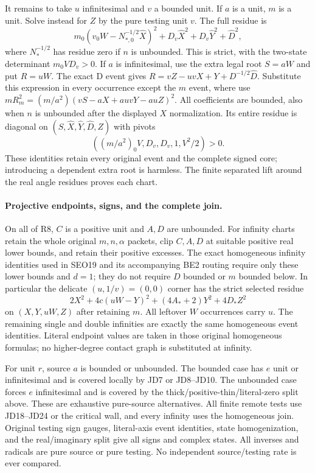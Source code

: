 It remains to take $u$ infinitesimal and $v$ a bounded unit.  If
$a$ is a unit, $m$ is a unit.  Solve instead for $Z$ by the pure
testing unit $v$.  The full residue is
\[
 m_0(v_0W-N_{*,0}^{-1/2}\widehat X)^2
       +D_v\widehat X^2+D_v\widehat Y^2+\widehat D^2,
                                                               \tag{JD23}
\]
where $N_*^{-1/2}$ has residue zero if $n$ is unbounded.  This is
strict, with the two-state determinant $m_0V D_v>0$.
If $a$ is infinitesimal, use the extra legal root $S=aW$ and put
$R=uW$.  The exact D event gives
$R=vZ-uvX+Y+D^{-1/2}\widehat D$.  Substitute this expression
in every occurrence except the $m$ event, where use
$mR_m^2=(m/a^2)(vS-aX+auvY-auZ)^2$.
All coefficients are bounded, also when $n$ is unbounded after
the displayed $X$ normalization.  Its entire residue is diagonal
on $(S,\widehat X,\widehat Y,\widehat D,Z)$ with pivots
\[
                    ((m/a^2)_0V,D_v,D_v,1,V^2/2)>0.   \tag{JD24}
\]
These identities retain every original event and the complete signed
core; introducing a dependent extra root is harmless.  The finite
separated lift around the real angle residues proves each chart.

\paragraph{Projective endpoints, signs, and the complete join.}
On all of R8, $C$ is a positive unit and $A,D$ are unbounded.
For infinity charts retain the whole original $m,n,\alpha$ packets,
clip $C,A,D$ at suitable positive real lower bounds, and retain their
positive excesses.  The exact homogeneous infinity identities used
in SEO19 and its accompanying BE2 routing require only these lower
bounds and $d=1$; they do not require $D$ bounded or $m$ bounded
below.  In particular the delicate $(u,1/v)=(0,0)$ corner has the
strict selected residue
\[
 2X^2+4c(uW-Y)^2+(4A_*+2)Y^2+4D_*Z^2
\]
on $(X,Y,uW,Z)$ after retaining $m$.  All leftover $W$ occurrences
carry $u$.  The remaining single and double infinities are exactly
the same homogeneous event identities.  Literal endpoint values are
taken in those original homogeneous formulas; no higher-degree
contact graph is substituted at infinity.

For unit $r$, source $a$ is bounded or unbounded.  The bounded case
has $e$ unit or infinitesimal and is covered locally by JD7 or
JD8--JD10.  The unbounded case forces $e$ infinitesimal and is
covered by the thick/positive-thin/literal-zero split above.  These
are exhaustive pure-source alternatives.  All finite remote tests
use JD18--JD24 or the critical wall, and every infinity uses the
homogeneous join.  Original testing sign gauges, literal-axis event
identities, state homogenization, and the real/imaginary split give
all signs and complex states.  All inverses and radicals are pure
source or pure testing.  No independent source/testing rate is ever
compared.

